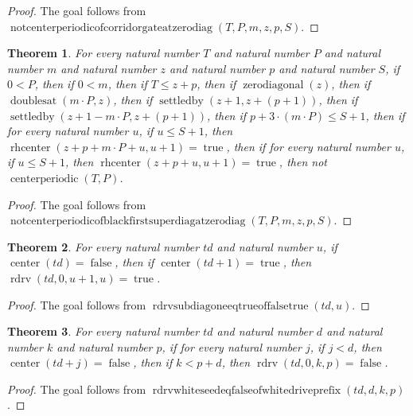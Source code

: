 \documentclass[11pt]{article}
\newtheorem{theorem}{Theorem}[section]
\theoremstyle{definition}
\begin{document}
\begin{proof}
The goal follows from \(\operatorname{notcenterperiodicofcorridorgateatzerodiag}(T, P, m, z, p, S)\).
\end{proof}
\begin{theorem}
\label{ll:paper:not-centerperiodic-of-black-first-superdiag-at-zero-diag}
For every natural number \(T\) and natural number \(P\) and natural number \(m\) and natural number \(z\) and natural number \(p\) and natural number \(S\), if \(0 < P\), then if \(0 < m\), then if \(T \le z + p\), then if \(\operatorname{zerodiagonal}(z)\), then if \(\operatorname{doublesat}(m \cdot P, z)\), then if \(\operatorname{settledby}(z + 1, z + (p + 1))\), then if \(\operatorname{settledby}(z + 1 - m \cdot P, z + (p + 1))\), then if \(p + 3 \cdot (m \cdot P) \le S + 1\), then if for every natural number \(u\), if \(u \le S + 1\), then \(\operatorname{rhcenter}(z + p + m \cdot P + u, u + 1) = \operatorname{true}\), then if for every natural number \(u\), if \(u \le S + 1\), then \(\operatorname{rhcenter}(z + p + u, u + 1) = \operatorname{true}\), then not \(\operatorname{centerperiodic}(T, P)\).
\end{theorem}
\begin{proof}
The goal follows from \(\operatorname{notcenterperiodicofblackfirstsuperdiagatzerodiag}(T, P, m, z, p, S)\).
\end{proof}
\begin{theorem}
\label{ll:paper:rdrv-subdiag-one-eq-true-of-false-true}
For every natural number \(td\) and natural number \(u\), if \(\operatorname{center}(td) = \operatorname{false}\), then if \(\operatorname{center}(td + 1) = \operatorname{true}\), then \(\operatorname{rdrv}(td, 0, u + 1, u) = \operatorname{true}\).
\end{theorem}
\begin{proof}
The goal follows from \(\operatorname{rdrvsubdiagoneeqtrueoffalsetrue}(td, u)\).
\end{proof}
\begin{theorem}
\label{ll:paper:rdrv-white-seed-eq-false-of-white-drive-prefix}
For every natural number \(td\) and natural number \(d\) and natural number \(k\) and natural number \(p\), if for every natural number \(j\), if \(j < d\), then \(\operatorname{center}(td + j) = \operatorname{false}\), then if \(k < p + d\), then \(\operatorname{rdrv}(td, 0, k, p) = \operatorname{false}\).
\end{theorem}
\begin{proof}
The goal follows from \(\operatorname{rdrvwhiteseedeqfalseofwhitedriveprefix}(td, d, k, p)\).
\end{proof}
\end{document}
